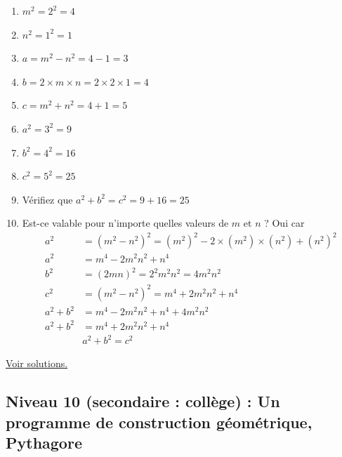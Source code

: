 \documentclass[11pt]{article}
\begin{document}
\begin{enumerate}
\item \(m^2 = 2^2 =  4\)
\item \(n^2 = 1^2 = 1\)
\item \(a = m^2 - n^2 = 4 - 1 = 3\)
\item \(b = 2 \times m \times n = 2\times 2\times 1 = 4\)
\item \(c = m^2 + n^2 = 4 + 1 = 5\)
\item \(a^2 = 3^2 = 9\)
\item \(b^2 = 4^2 = 16\)
\item \(c^2 = 5^2 = 25\)
\item Vérifiez que \(a^2 + b^2 = c^2 = 9 + 16 = 25\)
\item Est-ce valable pour n'importe quelles valeurs de \(m\) et \(n\) ? Oui car
\begin{align*}
    a^2 &= (m^2 - n^2)^2 = (m^2)^2 - 2\times (m^2)\times (n^2) + (n^2)^2 \\
    a^2 &= m^4 - 2m^2n^2 + n^4 \\
    b^2 &= (2mn)^2 = 2^2m^2n^2 = 4m^2n^2 \\
    c^2 &= (m^2 - n^2)^2 = m^4 + 2m^2n^2 + n^4 \\
    a^2 + b^2 &= m^4 - 2m^2n^2 + n^4 + 4m^2n^2 \\
    a^2 + b^2 &= m^4 + 2m^2n^2 + n^4\\
    &\boxed{a^2 + b^2 = c^2}
\end{align*}
\end{enumerate}


\hyperref[org966c153]{Voir solutions.}


\newpage

\subsection{Niveau 10 (secondaire : collège) : Un programme de construction géométrique, Pythagore}
\label{sec:org5b2eb95}

\label{org87f9f65}

\end{document}

